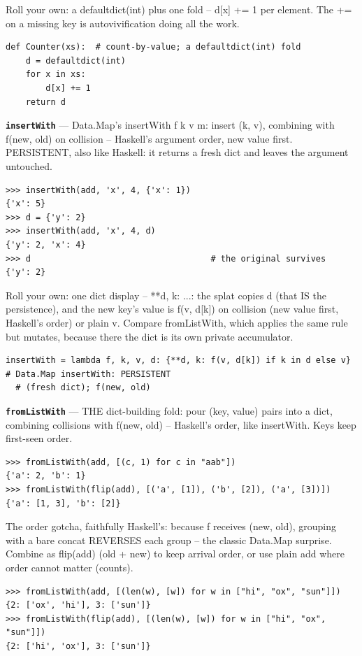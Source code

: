 \documentclass[10pt,letterpaper]{article}
\begin{document}
Roll your own: a defaultdict(int) plus one fold -- d[x] += 1 per element. The += on a missing key is autovivification doing all the work.

\begin{lstlisting}[style=ex]
def Counter(xs):  # count-by-value; a defaultdict(int) fold
    d = defaultdict(int)
    for x in xs:
        d[x] += 1
    return d
\end{lstlisting}
\textbf{\texttt{insertWith}} --- Data.Map's insertWith f k v m: insert (k, v), combining with f(new, old) on collision -- Haskell's argument order, new value first. PERSISTENT, also like Haskell: it returns a fresh dict and leaves the argument untouched.
\begin{lstlisting}[style=ex]
>>> insertWith(add, 'x', 4, {'x': 1})
{'x': 5}
>>> d = {'y': 2}
>>> insertWith(add, 'x', 4, d)
{'y': 2, 'x': 4}
>>> d                                    # the original survives
{'y': 2}
\end{lstlisting}

Roll your own: one dict display -- {**d, k: ...}: the splat copies d (that IS the persistence), and the new key's value is f(v, d[k]) on collision (new value first, Haskell's order) or plain v. Compare fromListWith, which applies the same rule but mutates, because there the dict is its own private accumulator.

\begin{lstlisting}[style=ex]
insertWith = lambda f, k, v, d: {**d, k: f(v, d[k]) if k in d else v}  # Data.Map insertWith: PERSISTENT
  # (fresh dict); f(new, old)
\end{lstlisting}
\textbf{\texttt{fromListWith}} --- THE dict-building fold: pour (key, value) pairs into a dict, combining collisions with f(new, old) -- Haskell's order, like insertWith. Keys keep first-seen order.
\begin{lstlisting}[style=ex]
>>> fromListWith(add, [(c, 1) for c in "aab"])
{'a': 2, 'b': 1}
>>> fromListWith(flip(add), [('a', [1]), ('b', [2]), ('a', [3])])
{'a': [1, 3], 'b': [2]}
\end{lstlisting}

The order gotcha, faithfully Haskell's: because f receives (new, old), grouping with a bare concat REVERSES each group -- the classic Data.Map surprise. Combine as flip(add) (old + new) to keep arrival order, or use plain add where order cannot matter (counts).

\begin{lstlisting}[style=ex]
>>> fromListWith(add, [(len(w), [w]) for w in ["hi", "ox", "sun"]])
{2: ['ox', 'hi'], 3: ['sun']}
>>> fromListWith(flip(add), [(len(w), [w]) for w in ["hi", "ox", "sun"]])
{2: ['hi', 'ox'], 3: ['sun']}
\end{lstlisting}
\end{document}
